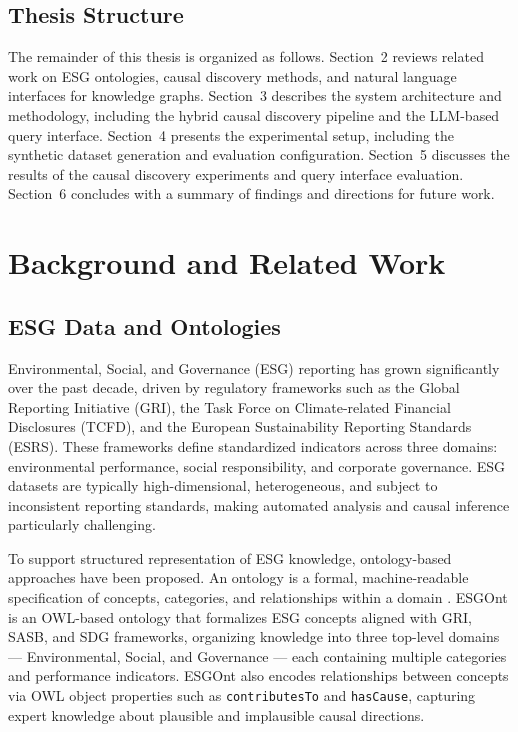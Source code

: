 \documentclass[a4paper,11pt,oneside]{article}
\begin{document}
\subsection{Thesis Structure}

The remainder of this thesis is organized as follows. Section~2 reviews related work on ESG ontologies, causal discovery methods, and natural language interfaces for knowledge graphs. Section~3 describes the system architecture and methodology, including the hybrid causal discovery pipeline and the LLM-based query interface. Section~4 presents the experimental setup, including the synthetic dataset generation and evaluation configuration. Section~5 discusses the results of the causal discovery experiments and query interface evaluation. Section~6 concludes with a summary of findings and directions for future work.

\section{Background and Related Work}

\subsection{ESG Data and Ontologies}

Environmental, Social, and Governance (ESG) reporting has grown significantly over the past decade, driven by regulatory frameworks such as the Global Reporting Initiative (GRI), the Task Force on Climate-related Financial Disclosures (TCFD), and the European Sustainability Reporting Standards (ESRS). These frameworks define standardized indicators across three domains: environmental performance, social responsibility, and corporate governance. ESG datasets are typically high-dimensional, heterogeneous, and subject to inconsistent reporting standards, making automated analysis and causal inference particularly challenging.

To support structured representation of ESG knowledge, ontology-based approaches have been proposed. An ontology is a formal, machine-readable specification of concepts, categories, and relationships within a domain \cite{gruber1993}. ESGOnt \cite{wicaksono2022} is an OWL-based ontology that formalizes ESG concepts aligned with GRI, SASB, and SDG frameworks, organizing knowledge into three top-level domains — Environmental, Social, and Governance — each containing multiple categories and performance indicators. ESGOnt also encodes relationships between concepts via OWL object properties such as \texttt{contributesTo} and \texttt{hasCause}, capturing expert knowledge about plausible and implausible causal directions.
\end{document}
